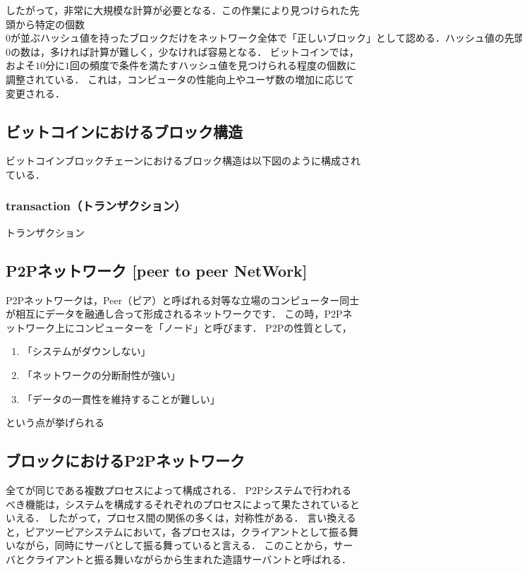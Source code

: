 \documentclass[a4paper,12pt]{jsarticle}
\begin{document}
したがって，非常に大規模な計算が必要となる．この作業により見つけられた先頭から特定の個数$0が並ぶハッシュ値を持ったブロックだけをネットワーク全体で「正しいブロック」として認める．
ハッシュ値の先頭から並ぶ$0の数は，多ければ計算が難しく，少なければ容易となる．
ビットコインでは，およそ$10$分に$1$回の頻度で条件を満たすハッシュ値を見つけられる程度の個数に調整されている．
これは，コンピュータの性能向上やユーザ数の増加に応じて変更される．


      \subsection{ビットコインにおけるブロック構造}
ビットコインブロックチェーンにおけるブロック構造は以下図のように構成されている．


            \subsubsection{transaction（トランザクション）}
トランザクション


      \subsection{P2Pネットワーク [peer to peer NetWork]}%
P2Pネットワークは，Peer（ピア）と呼ばれる対等な立場のコンピューター同士が相互にデータを融通し合って形成されるネットワークです．
この時，P2Pネットワーク上にコンピューターを「ノード」と呼びます．
P2Pの性質として，
\begin{enumerate}
  \item 「システムがダウンしない」
  
  \item 「ネットワークの分断耐性が強い」
  
  \item 「データの一貫性を維持することが難しい」
  \end{enumerate}
という点が挙げられる

      \subsection{ブロックにおけるP2Pネットワーク }
全てが同じである複数プロセスによって構成される．
P2Pシステムで行われるべき機能は，システムを構成するそれぞれのプロセスによって果たされているといえる．
したがって，プロセス間の関係の多くは，対称性がある．
言い換えると，ピアツーピアシステムにおいて，各プロセスは，クライアントとして振る舞いながら，同時にサーバとして振る舞っていると言える．
このことから，サーバとクライアントと振る舞いながらから生まれた造語サーバントと呼ばれる．
\end{document}
